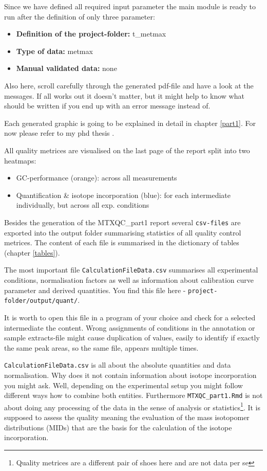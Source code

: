 \documentclass[]{book}
\providecommand{\tightlist}{%
  \setlength{\itemsep}{0pt}\setlength{\parskip}{0pt}}
\let\rmarkdownfootnote\footnote%
\def\footnote{\protect\rmarkdownfootnote}
\begin{document}
Since we have defined all required input parameter the main module is ready to run after the definition of only three parameter:

\begin{itemize}
\tightlist
\item
  \textbf{Definition of the project-folder:} t\_metmax
\item
  \textbf{Type of data:} metmax
\item
  \textbf{Manual validated data:} none
\end{itemize}

Also here, scroll carefully through the generated pdf-file and have a look at the messages. If all works out it doesn't matter, but it might help to know what should be written if you end up with an error message instead of.

Each generated graphic is going to be explained in detail in chapter \ref{part1}. For now please refer to my phd thesis \citep{Zasada2017}.

All quality metrices are visualised on the last page of the report split into two heatmaps:

\begin{itemize}
\tightlist
\item
  GC-performance (orange): across all measurements
\item
  Quantification \& isotope incorporation (blue): for each intermediate individually, but across all exp. conditions
\end{itemize}

Besides the generation of the MTXQC\_part1 report several \texttt{csv-files} are exported into the output folder summarising statistics of all quality control metrices. The content of each file is summarised in the dictionary of tables (chapter \ref{tables}).

The most important file \texttt{CalculationFileData.csv} summarises all experimental conditions, normalisation factors as well as information about calibration curve parameter and derived quantities. You find this file here - \texttt{project-folder/output/quant/}.

It is worth to open this file in a program of your choice and check for a selected intermediate the content. Wrong assignments of conditions in the annotation or sample extracts-file might cause duplication of values, easily to identify if exactly the same peak areas, so the same file, appears multiple times.

\texttt{CalculationFileData.csv} is all about the absolute quantities and data normalisation. Why does it not contain information about isotope incorporation you might ask. Well, depending on the experimental setup you might follow different ways how to combine both entities. Furthermore \texttt{MTXQC\_part1.Rmd} is not about doing any processing of the data in the sense of analysis or statistics\footnote{Quality metrices are a different pair of shoes here and are not data per se}. It is supposed to assess the quality meaning the evaluation of the mass isotopomer distributions (MIDs) that are the basis for the calculation of the isotope incorporation.
\end{document}
